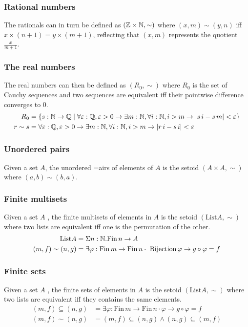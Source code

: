 \documentclass[preprint,12pt]{elsarticle}
\newcommand{\List}{\mathrm{List}}
\newcommand{\Fin}{\mathrm{Fin}}
\newcommand{\Z}{\mathbb{Z}}
\begin{document}
\subsubsection*{Rational numbers}
The rationals can in turn be defined as $(\Z\times\nat,\sim)$ where $(x,m)\sim(y,n)$ if{f} $x\times(n+1)=y\times(m+1)$, reflecting that $(x,m)$ represents the quotient $\frac {x}{m+1}$.
\subsubsection*{The real numbers}
The real numbers can then be defined as $(R_0,\sim)$ where $R_0$ is the set of Cauchy sequences and two sequences are equivalent if{f} their pointwise difference converges to $0$. 
\begin{align*}
R_0&=\set{s : \nat\to\Q \mid \forall\varepsilon :\Q,\varepsilon>0\to\exists m:\nat, \forall i:\nat, i>m\to |s\,i - s\, m|<\varepsilon}\\
r\sim s &= \forall\varepsilon :\Q,\varepsilon>0\to\exists m:\nat, \forall i:\nat, i>m\to |r\,i - s\,i|<\varepsilon
\end{align*}

\subsubsection*{Unordered pairs}
Given a set $A$, the unordered =airs of elements of $A$ is the setoid $(A\times A,\sim)$ where
$(a,b)\sim(b,a)$.

\subsubsection*{Finite multisets}
Given a set $A$ , the finite multisets of elements in $A$ is the setoid $(\List A,\sim)$ where two lists are equivalent if{f} one is the permutation of the other.
\begin{align*}
\List A &= \Sigma n:\nat.\Fin\,n\to A\\
(m,f)\sim(n,g) &= \exists \varphi : \Fin\,m \to \Fin\,n \cdot\ \mathrm{Bijection}\,\varphi \to g\circ\varphi = f  
\end{align*}

\subsubsection*{Finite sets}
Given a set $A$ , the finite sets of elements in $A$ is the setoid $(\List A,\sim)$ where two lists are equivalent if{f} they contains the same elements.
\begin{align*}
(m,f)\subseteq(n,g) &= \exists \varphi : \Fin\,m \to \Fin\,n \cdot \varphi \to g\circ\varphi = f  \\
(m,f)\sim(n,g)&= (m,f)\subseteq(n,g) \wedge (n,g)\subseteq(m,f)
\end{align*}
\end{document}
